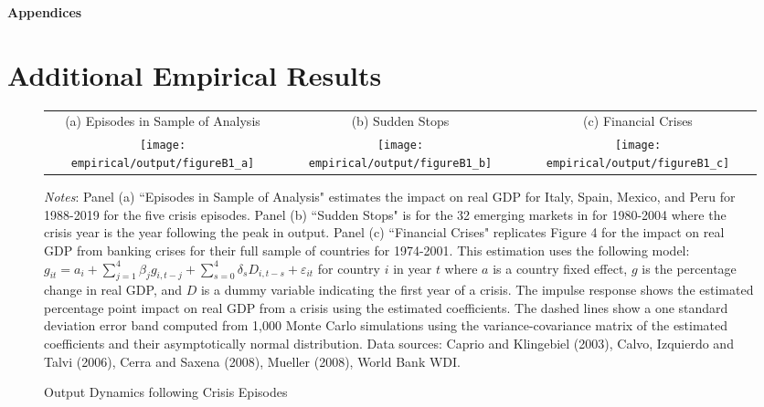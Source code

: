 \documentclass[12pt]{article}
\begin{document}
\begin{spacing}{1.5}

\setcounter{section}{0}
\renewcommand{\thesection}{\Alph{section}}

\setcounter{table}{0}
\setcounter{figure}{0}

\appendix

\bigskip
\begin{center}
 \bf\Large Appendices
\end{center}


\section{Additional Empirical Results}


\begin{figure}[H]
\setlength{\tabcolsep}{1pt}
\renewcommand{\arraystretch}{1} 
\begin{tabular}{ccc}
{\footnotesize{}{(a) Episodes in Sample of Analysis} } & {\footnotesize{}{(b) Sudden Stops} } &  { \footnotesize{}{(c) Financial Crises} }  \vspace{.5em} \tabularnewline
\texttt{[image: empirical/output/figureB1\_a]}   &
\texttt{[image: empirical/output/figureB1\_b]}   &
\texttt{[image: empirical/output/figureB1\_c]} 
\end{tabular}
\caption{Output Dynamics following Crisis Episodes
\label{crises}}
\medskip{}
\raggedright{}\textit{\footnotesize{}Notes}{\footnotesize{}: Panel (a) ``Episodes in Sample of Analysis" estimates the impact on real GDP for Italy, Spain, Mexico, and Peru for 1988-2019 for the five crisis episodes.  Panel (b) ``Sudden Stops" is for the 32 emerging markets in \cite{calvo2006sudden} for 1980-2004 where the crisis year is the year following the peak in output.  Panel (c) ``Financial Crises" replicates \cite{cerra2008growth} Figure 4 for the impact on real GDP from banking crises for their full sample of countries for 1974-2001. This estimation uses the following model: $g_{it} = a_i + \sum_{j = 1}^4 \beta_j g_{i,t-j} + \sum_{s=0}^4 \delta_s D_{i,t-s} + \varepsilon_{it}$ for country $i$ in year $t$ where $a$ is a country fixed effect, $g$ is the percentage change in real GDP, and $D$ is a dummy variable indicating the first year of a crisis. The impulse response shows the estimated percentage point impact on real GDP from a crisis using the estimated coefficients. The dashed lines show a one standard deviation error band computed from 1,000 Monte Carlo simulations using the variance-covariance matrix of the estimated coefficients and their asymptotically normal distribution. Data sources: Caprio and Klingebiel (2003), Calvo, Izquierdo and Talvi (2006), Cerra and Saxena (2008), Mueller (2008), World Bank WDI.}{\footnotesize\par}


\end{figure}
\end{spacing}
\end{document}
